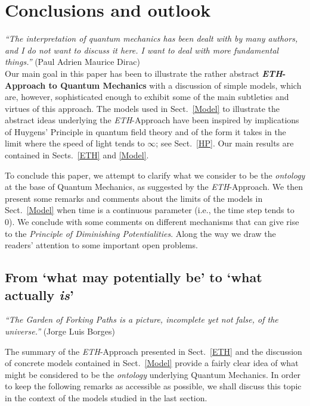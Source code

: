 \documentclass[12pt]{article}
\begin{document}
{\section{Conclusions and outlook}\label{Conclusions}

\hspace{0.5cm}\textit{``The interpretation of quantum mechanics has been dealt with by many authors, and I do not want to discuss it here. I want to deal with more fundamental things.''} (Paul Adrien Maurice Dirac)\\

Our main goal in this paper has been to illustrate the rather abstract {\bf{\textit{ETH}-Approach to Quantum Mechanics}}
with a discussion of simple models, which are, however, sophisticated enough to exhibit some of the main subtleties
and virtues of this approach. The models used in Sect.~\ref{Model} to illustrate the abstract ideas underlying the
\textit{ETH}-Approach have been inspired by implications of Huygens' Principle in quantum field theory and of the form
it takes in the limit where the speed of light tends to $\infty$; see Sect.~\ref{HP}. Our main results are contained in
Sects.~\ref{ETH} and \ref{Model}.

To conclude this paper, we attempt to clarify what we consider to be the \textit{ontology} at the base of Quantum
Mechanics, as suggested by the \textit{ETH}-Approach. We then present some remarks and comments about the limits of
the models in Sect.~\ref{Model} when time is a continuous parameter (i.e., the time step tends to 0). We conclude
with some comments on different mechanisms that can give rise to the \textit{Principle of Diminishing Potentialities}.
Along the way we draw the readers' attention to some important open problems.

\subsection{From `what may potentially be' to `what actually \textit{is}'}

\hspace{0.5cm}\textit{``The Garden of Forking Paths is a picture, incomplete yet not false, of the universe.''} (Jorge Luis Borges)

The summary of the \textit{ETH}-Approach presented in Sect.~\ref{ETH} and the discussion of concrete models contained
in Sect.~\ref{Model} provide a fairly clear idea of what might be considered to be the \textit{ontology} underlying Quantum
Mechanics. In order to keep the following remarks as accessible as possible, we shall discuss this topic in the
context of the models studied in the last section.

}
\end{document}
